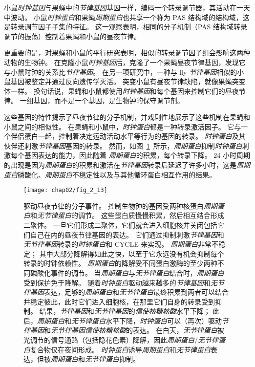 小鼠\textit{时钟基因}与果蝇中的\textit{节律基因}基因一样，编码一个转录调节器，其活动在一天中波动。
小鼠\textit{时钟蛋白}和果蝇\textit{周期蛋白}也共享一个称为 PAS 结构域的结构域，这是转录调节因子子集的特征。
这一观察表明，相同的分子机制（PAS 结构域转录调节的振荡）控制着果蝇和小鼠的昼夜节律。


更重要的是，对果蝇和小鼠的平行研究表明，相似的转录调节因子组会影响这两种动物的生物钟。
在克隆小鼠\textit{时钟基因}后，克隆了一个果蝇昼夜节律基因，发现它与小鼠时钟的关系比\textit{节律基因}。
在另一项研究中，一种与 fly \textit{节律基因}相似的小鼠基因被鉴定并通过反向遗传学灭活。
突变小鼠有昼夜节律缺陷，就像果蝇突变体一样。
换句话说，果蝇和小鼠都使用\textit{时钟基因}和每个基因来控制它们的昼夜节律。
一组基因，而不是一个基因，是生物钟的保守调节剂。


这些基因的特性揭示了昼夜节律的分子机制，并戏剧性地展示了这些机制在果蝇和小鼠之间的相似性。
在果蝇和小鼠中，\textit{时钟蛋白}都是一种转录激活因子。 
它与一个伴侣蛋白一起，控制着决定运动活动水平等行为的基因的转录。
\textit{时钟蛋白}及其伙伴还刺激\textit{节律基因}基因的转录。
然而，如图~\ref{fig:2_13}~所示，\textit{周期蛋白}抑制\textit{时钟蛋白}刺激每个基因表达的能力，因此随着 \textit{周期蛋白}的积累，每个转录下降。
24 小时周期的出现是因为\textit{周期蛋白}的积累和激活在\textit{节律基因}转录后延迟了许多小时，这是\textit{周期蛋白}磷酸化、\textit{周期蛋白}不稳定性以及与其他循环蛋白相互作用的结果。



\begin{figure}[htbp]
	\centering
	\texttt{[image: chap02/fig\_2\_13]}
	\caption{驱动昼夜节律的分子事件。
		控制生物钟的基因受两种核蛋白\textit{周期蛋白}和\textit{无节律蛋白}的调节。
		这些蛋白质慢慢积累，然后相互结合形成二聚体。
		一旦它们形成二聚体，它们就会进入细胞核并关闭包括它们自己在内的昼夜节律基因的表达。
		它们通过抑制刺激\textit{节律基因}和\textit{无节律基因}转录的\textit{时钟蛋白}和 CYCLE 来实现。
		\textit{周期蛋白}非常不稳定；
		其中大部分降解得如此之快，以至于它永远没有机会抑制每个转录的时钟依赖性。 
		\textit{周期蛋白}的降解受不同蛋白激酶的至少两种不同磷酸化事件的调节。
		当\textit{周期蛋白}与\textit{无节律蛋白}结合时，\textit{周期蛋白}受到保护免于降解。 
		随着\textit{时钟蛋白}驱动越来越多的\textit{节律基因}和\textit{无节律基因}表达，足够的\textit{周期蛋白}和\textit{无节律蛋白}最终积累到两者可以结合并稳定彼此，此时它们进入细胞核，在那里它们自身的转录受到抑制。
		结果，\textit{节律基因}和\textit{无节律基因}的\textit{信使核糖核酸}水平下降；
		此后，\textit{周期蛋白}和\textit{无节律蛋白}水平下降，\textit{时钟蛋白}可以（再次）驱动\textit{节律基因}和\textit{无节律基因}\textit{信使核糖核酸}的表达。
		在白天，\textit{无节律蛋白}被光调节的信号通路（包括隐花色素）降解，因此\textit{周期蛋白}/\textit{无节律蛋白}复合物仅在夜间形成。
		\textit{时钟蛋白}诱导\textit{周期蛋白}和\textit{无节律蛋白}表达，但被\textit{周期蛋白}和\textit{无节律蛋白}抑制。}
	\label{fig:2_13}
\end{figure}


